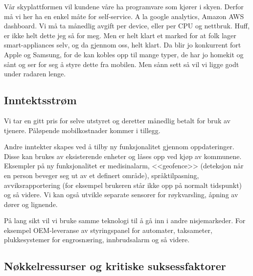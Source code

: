 Vår skyplattformen vil kundene våre ha programvare som kjører i skyen. Derfor
må vi her ha en enkel måte for self-service. A la google analytics, Amazon AWS
dashboard. Vi må ta månedlig avgift per device, eller per CPU og nettbruk.
Huff, er ikke helt dette jeg så for meg. Men er helt klart et marked for at
folk lager smart-appliances selv, og da gjennom oss, helt klart. Da blir jo
konkurrent fort Apple og Samsung, for de kan kobles opp til mange typer, de har
jo homekit og sånt og ser for seg å styre dette fra mobilen.
Men sånn sett så vil vi ligge godt under radaren lenge.

\subsection{Inntektsstrøm}


Vi tar en gitt pris for selve utstyret og deretter månedlig betalt for bruk av
tjenere. Påløpende mobilkostnader kommer i tillegg.

Andre inntekter skapes ved å tilby ny funksjonalitet gjennom oppdateringer.
Disse kan brukes av eksisterende enheter og låses opp ved kjøp av kommunene.
Eksempler på ny funksjonalitet er medisinalarm, <<geofence>> (deteksjon når en
person beveger seg ut av et definert område), språktilpasning,
avviksrapportering (for eksempel brukeren står ikke opp på normalt tidspunkt)
og så videre. Vi kan også utvikle separate sensorer for røykvarsling, åpning av
dører og lignende.

På lang sikt vil vi bruke samme teknologi til å gå inn i andre nisjemarkeder.
For eksempel OEM-leveranse av styringspanel for automater, taksameter,
plukkesystemer for engrosnæring, innbrudsalarm og så videre.

\subsection{Nøkkelressurser og kritiske suksessfaktorer}



